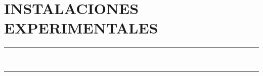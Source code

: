\pagestyle{plain}
\chapter{INSTALACIONES EXPERIMENTALES}\label{cap:InstalacionesExperimentales}
\vspace{0.2cm}
\noindent\rule{\linewidth}{1.5pt}\\
\startcontents[chapters]
\vspace{0.2cm}
\noindent\rule{\linewidth}{1.3pt}\\
\newpage

\newpage
		

